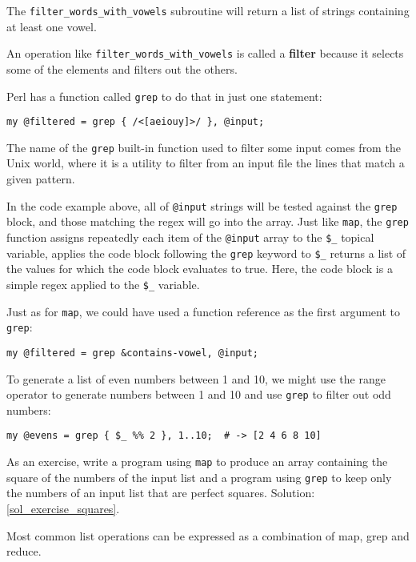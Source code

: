 The \verb"filter_words_with_vowels" subroutine will return 
a list of strings containing at least one vowel.

An operation like \verb"filter_words_with_vowels" is called 
a {\bf filter} because it selects some of the elements and 
filters out the others.

Perl has a function called {\tt grep} to do that in just 
one statement:

\begin{verbatim}
my @filtered = grep { /<[aeiouy]>/ }, @input;
\end{verbatim}
%

The name of the {\tt grep} built-in function used to 
filter some input comes from the Unix world, where it 
is a utility to filter from an input file the lines that 
match a given pattern.

In the code example above, all of \verb'@input' strings 
will be tested against the 
{\tt grep} block, and those matching the regex will go into the 
{\tt \@filtered} array. Just like {\tt map}, the {\tt grep} 
function assigns repeatedly each item of the \verb"@input" 
array to the \verb'$_' topical variable, applies the 
code block following the {\tt grep} keyword to \verb'$_'  
returns a list of the values for which the code block 
evaluates to true. Here, the code block is a simple regex 
applied to the \verb'$_' variable.

Just as for {\tt map}, we could have used a function 
reference as the first argument to  {\tt grep}:

\begin{verbatim}
my @filtered = grep &contains-vowel, @input;
\end{verbatim}
%

To generate a list of even numbers between 1 and 10, we might 
use the range operator to generate numbers between 1 and 10 
and use {\tt grep} to filter out odd numbers:

\begin{verbatim}
my @evens = grep { $_ %% 2 }, 1..10;  # -> [2 4 6 8 10]
\end{verbatim}
%

\label{exercise_squares}
As an exercise, write a program using {\tt map} to 
produce an array containing the square of the numbers 
of the input list and a program using {\tt grep} to keep 
only the numbers of an input list that are perfect squares. Solution: \ref{sol_exercise_squares}.

Most common list operations can be expressed as a combination
of map, grep and reduce.

